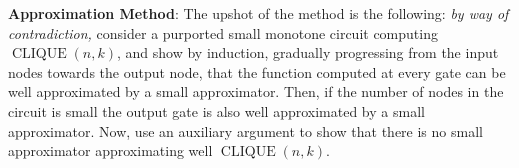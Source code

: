 \begin{tcolorbox}[colframe=white, colback=blue!5, boxrule=0mm, sharp corners]
\textbf{Approximation Method}:
The upshot of the method is the following: \emph{by  way of contradiction,} consider a purported small monotone circuit computing  $\operatorname{CLIQUE}({n}, {k})$, and show by induction, gradually progressing from the input nodes towards the output node, that the function computed at every gate can be well approximated by a small approximator. Then, if the number of nodes in the circuit is small the output gate is also well approximated by a small approximator. Now, use an auxiliary argument to show that there is no small approximator approximating well  $\operatorname{CLIQUE}({n}, {k})$.
\end{tcolorbox}

